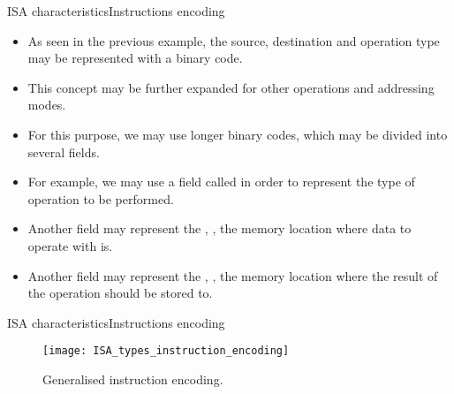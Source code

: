 \documentclass[]{slides}
\begin{document}
\begin{frame}{\acs{ISA} characteristics}{Instructions encoding}
  \begin{itemize}
	\item As seen in the previous example, the source, destination and operation type may be represented with a  binary code.
	\item This concept may be further expanded for other operations and addressing modes.
	\item For this purpose, we may use longer binary codes, which may be divided into several fields.
	\item For example, we may use a field called  in order to represent the type of operation to be performed.
	\item Another field may represent the , \ie, the memory location where data to operate with is.
	\item Another field may represent the , \ie, the memory location where the result of the operation should be stored to. 
  \end{itemize}     
\end{frame}

\begin{frame}{\acs{ISA} characteristics}{Instructions encoding}
\vspace{-7pt}
\begin{figure}
\texttt{[image: ISA\_types\_instruction\_encoding]}
\vspace{-2pt}
\caption{Generalised instruction encoding.}
\label{Figure:types_instruction_encoding}
\end{figure}   
\end{frame}
\end{document}
